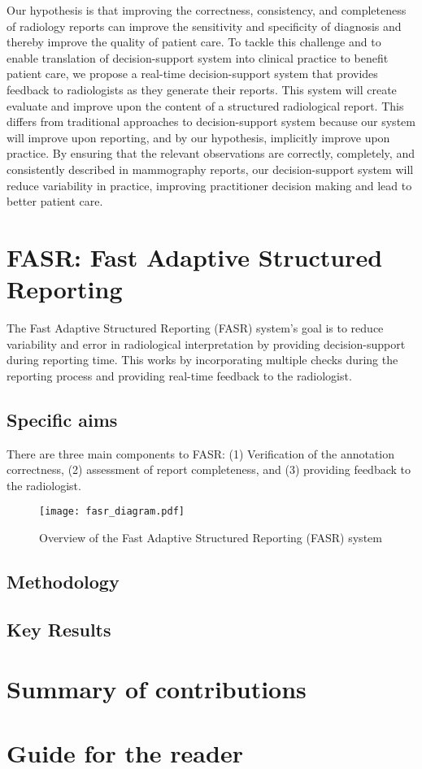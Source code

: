 Our hypothesis is that improving the correctness, consistency, and completeness of radiology reports can improve the sensitivity and specificity of diagnosis and thereby improve the quality of patient care. To tackle this challenge and to enable translation of decision-support system into clinical practice to benefit patient care, we propose a real-time decision-support system that provides feedback to radiologists as they generate their reports. This system will create evaluate and improve upon the content of a structured radiological report. This differs from traditional approaches to decision-support system because our system will improve upon reporting, and by our hypothesis, implicitly improve upon practice. By ensuring that the relevant observations are correctly, completely, and consistently described in mammography reports, our decision-support system will reduce variability in practice, improving practitioner decision making and lead to better patient care.

\section{FASR: Fast Adaptive Structured Reporting}
The Fast Adaptive Structured Reporting (FASR) system's goal is to reduce variability and error in radiological interpretation by providing decision-support during reporting time. This works by incorporating multiple checks during the reporting process and providing real-time feedback to the radiologist.

\subsection{Specific aims}
There are three main components to FASR: (1) Verification of the annotation correctness, (2) assessment of report completeness, and (3) providing feedback to the radiologist.

\begin{figure}[h]
	\centering
	\texttt{[image: fasr\_diagram.pdf]}
	\caption{Overview of the Fast Adaptive Structured Reporting (FASR) system}
	\label{fig:fasr_diagram}
\end{figure}

\subsection{Methodology}

\subsection{Key Results}


\section{Summary of contributions}

\section{Guide for the reader}
